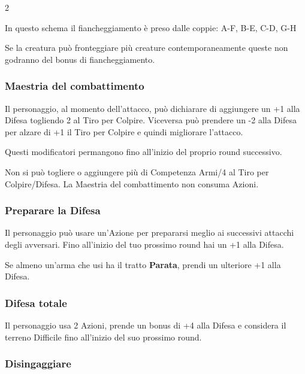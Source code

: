 \begin{multicols}{2}
\bigskip

In questo schema il fiancheggiamento è preso dalle coppie: A-F, B-E, C-D, G-H

\bigskip

Se la creatura può fronteggiare più creature contemporaneamente queste non godranno del bonus di fiancheggiamento.

\subsubsection{Maestria del combattimento} \label{maestriacombattimento}

Il personaggio, al momento dell'attacco, può dichiarare di aggiungere un +1 alla Difesa togliendo 2 al Tiro per Colpire. Viceversa può prendere un -2 alla Difesa per alzare di +1 il Tiro per Colpire e quindi migliorare l'attacco.

Questi modificatori permangono fino all'inizio del proprio round successivo.

Non si può togliere o aggiungere più di Competenza Armi/4 al Tiro per Colpire/Difesa. La Maestria del combattimento non consuma Azioni.

\subsubsection{Preparare la Difesa}\label{preparareladifesa}\hypertarget{preparareladifesa}{}

Il personaggio può usare un'Azione per prepararsi meglio ai successivi attacchi degli avversari. Fino all'inizio del tuo prossimo round hai un +1 alla Difesa.

Se almeno un'arma che usi ha il tratto \textbf{Parata}, prendi un ulteriore +1 alla Difesa.

\subsubsection{Difesa totale} \label{difesatotale}\hypertarget{difesatotale}{}

Il personaggio usa 2 Azioni, prende un bonus di +4 alla Difesa e considera il terreno Difficile fino all'inizio del suo prossimo round.

\subsubsection{Disingaggiare} \label{disingaggiare}\hypertarget{disingaggiare}{}


\end{multicols}
